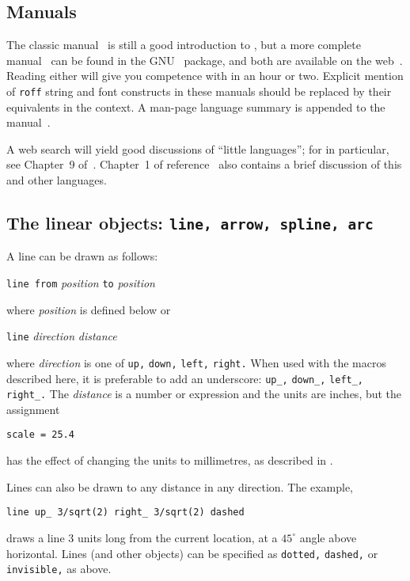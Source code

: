 \subsection{Manuals\label{Manuals:}}
The classic \pic manual~\cite{KRpic} is still a good introduction to \pic, but
a more complete manual~\cite{Raymond95} can be found in the GNU \groff\
package, and both are available on the web~\cite{KRpic,Raymond95}.  Reading
either will give you competence with \pic in an hour or two.  Explicit mention
of {\tt *roff} string and font constructs in these manuals should be replaced by
their equivalents in the \latex context.  A man-page language summary is
appended to the \dpic manual~\cite{Aplevich2011}.

A web search will yield good discussions of ``little languages'';
for \pic in particular, see Chapter~9 of~\cite{Bentley88}.
Chapter~1 of reference~\cite{Goossens97} also contains a brief
discussion of this and other languages.

\subsection{The linear objects: {\tt line, arrow, spline, arc}%
\label{Linearobjects:}}
A line can be drawn as follows:

{\tt line from} {\sl position} {\tt to} {\sl position}

\noindent
where {\sl position} is defined below or

{\tt line} {\sl direction} {\sl distance}

\noindent
where {\sl direction} is one of {\tt up,} {\tt down,} {\tt left,}
{\tt right.}  When used with the \Mfour macros described here, it is
preferable to add an underscore: {\tt up\_,} {\tt down\_,} {\tt left\_,}
{\tt right\_.}  The {\sl distance} is a number or expression
and the units are inches, but the assignment

{\tt scale = 25.4}

\noindent
has the effect of changing the units to millimetres,
as described in .

Lines can also be drawn to any distance in any direction.  The example,

{\tt line up\_ 3/sqrt(2) right\_ 3/sqrt(2) dashed}

\noindent
draws a line 3 units long from the current location,
at a $45^\circ$ angle above horizontal.
Lines (and other objects) can be specified as {\tt dotted,} {\tt dashed,} or
{\tt invisible,} as above.

